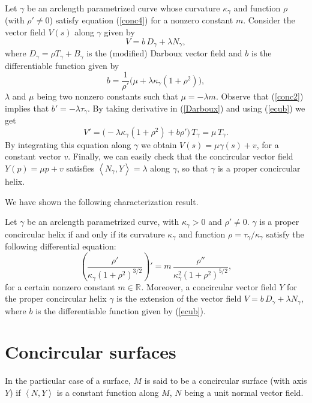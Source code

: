 \documentclass[eqnumis, pdf]{hjms}
\def\R#1{\ensuremath{\mathbb{R}^{#1}}}
\def\<{\left<}
\def\>{\right>}
\begin{document}
Let $\gamma$ be an arclength parametrized curve whose curvature $\kappa_\gamma$ and function $\rho$ (with $\rho'\neq0$) satisfy equation (\ref{conc4}) for a nonzero constant $m$. Consider the vector field $V(s)$ along $\gamma$ given by
\begin{equation}\label{Darboux}
V=b\,D_\gamma+ \lambda N_\gamma,
\end{equation}
where $D_\gamma=\rho T_\gamma+B_\gamma$ is the (modified) Darboux vector field and $b$ is the differentiable function given by
\begin{equation}\label{ecub}
b=\frac{1}{\rho'}\big(\mu+\lambda\kappa_\gamma(1+\rho^2)\big),
\end{equation}
$\lambda$ and $\mu$ being two nonzero constants such that $\mu=-\lambda m$. Observe that (\ref{conc2}) implies that $b'=-\lambda\tau_\gamma$.
By taking derivative in (\ref{Darboux}) and using (\ref{ecub}) we get
\[
V'=\big(-\lambda\kappa_\gamma(1+\rho^2)+b\rho'\big)\,T_\gamma=\mu\,T_\gamma.
\]
By integrating this equation along $\gamma$ we obtain $V(s)=\mu\gamma(s)+v$, for a constant vector $v$. Finally, we can easily check that the concircular vector field $Y(p)=\mu p+v$ satisfies $\<N_\gamma,Y\>=\lambda$ along $\gamma$, so that $\gamma$ is a proper concircular helix.

We have shown the following characterization result.

\begin{theorem}\label{teoconc1}
Let $\gamma$ be an arclength parametrized curve, with $\kappa_\gamma>0$ and $\rho'\neq0$. $\gamma$ is a proper concircular helix if and only if its curvature $\kappa_\gamma$ and function $\rho=\tau_\gamma/\kappa_\gamma$ satisfy the following differential equation:
\[
\left(\frac{\rho'}{\kappa_\gamma(1+\rho^2)^{3/2}}\right)'= m\,\frac{\rho''}{\kappa_\gamma^2(1+\rho^2)^{5/2}},
\]
for a certain nonzero constant $m\in\R{}$. Moreover, a concircular vector field $Y$ for the proper concircular helix $\gamma$ is the extension of the vector field  $V=b\,D_\gamma+ \lambda N_\gamma$, where $b$ is the differentiable function given by (\ref{ecub}).
\end{theorem}

\section{Concircular surfaces}
\label{s:surfaces}

In the particular case of a surface, $M$ is said to be a concircular surface (with axis $Y$) if $\<N,Y\>$ is a constant function along $M$, $N$ being a unit normal vector field.
\end{document}
